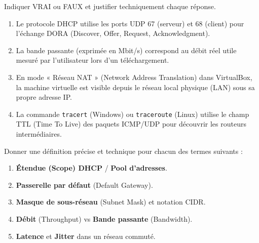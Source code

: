 \documentclass[11pt]{article}
\begin{document}
\begin{exercice}
Indiquer VRAI ou FAUX et justifier techniquement chaque réponse.
\begin{enumerate}
    \item Le protocole DHCP utilise les ports UDP 67 (serveur) et 68 (client) pour l'échange DORA (Discover, Offer, Request, Acknowledgment).
    \item La bande passante (exprimée en Mbit/s) correspond au débit réel utile mesuré par l'utilisateur lors d'un téléchargement.
    \item En mode « Réseau NAT » (Network Address Translation) dans VirtualBox, la machine virtuelle est visible depuis le réseau local physique (LAN) sous sa propre adresse IP.
    \item La commande \texttt{tracert} (Windows) ou \texttt{traceroute} (Linux) utilise le champ TTL (Time To Live) des paquets ICMP/UDP pour découvrir les routeurs intermédiaires.
\end{enumerate}
\end{exercice}

\begin{exercice}
Donner une définition précise et technique pour chacun des termes suivants :
\begin{enumerate}
    \item \textbf{Étendue (Scope) DHCP} / \textbf{Pool d'adresses}.
    \item \textbf{Passerelle par défaut} (Default Gateway).
    \item \textbf{Masque de sous-réseau} (Subnet Mask) et notation CIDR.
    \item \textbf{Débit} (Throughput) vs \textbf{Bande passante} (Bandwidth).
    \item \textbf{Latence} et \textbf{Jitter} dans un réseau commuté.
\end{enumerate}
\end{exercice}
\end{document}

